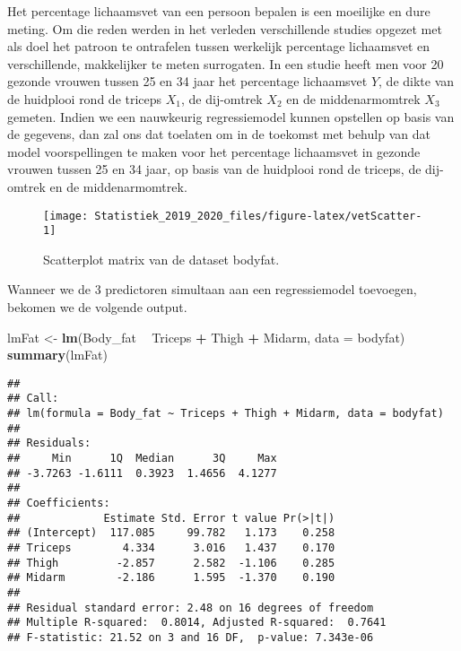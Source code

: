 \documentclass[12pt,dutch,coursenotes]{book}
\newenvironment{Shaded}{\begin{snugshade}}{\end{snugshade}}
\newcommand{\KeywordTok}[1]{\textcolor[rgb]{0.13,0.29,0.53}{\textbf{#1}}}
\newcommand{\DataTypeTok}[1]{\textcolor[rgb]{0.13,0.29,0.53}{#1}}
\newcommand{\StringTok}[1]{\textcolor[rgb]{0.31,0.60,0.02}{#1}}
\newcommand{\OperatorTok}[1]{\textcolor[rgb]{0.81,0.36,0.00}{\textbf{#1}}}
\newcommand{\NormalTok}[1]{#1}
\theoremstyle{definition}
\theoremstyle{definition}
\theoremstyle{definition}
\theoremstyle{remark}
\begin{document}
Het percentage lichaamsvet van een persoon bepalen is een moeilijke en
dure meting. Om die reden werden in het verleden verschillende studies
opgezet met als doel het patroon te ontrafelen tussen werkelijk
percentage lichaamsvet en verschillende, makkelijker te meten
surrogaten. In een studie heeft men voor 20 gezonde vrouwen tussen 25 en
34 jaar het percentage lichaamsvet \(Y\), de dikte van de huidplooi rond
de triceps \(X_1\), de dij-omtrek \(X_2\) en de middenarmomtrek \(X_3\)
gemeten. Indien we een nauwkeurig regressiemodel kunnen opstellen op
basis van de gegevens, dan zal ons dat toelaten om in de toekomst met
behulp van dat model voorspellingen te maken voor het percentage
lichaamsvet in gezonde vrouwen tussen 25 en 34 jaar, op basis van de
huidplooi rond de triceps, de dij-omtrek en de middenarmomtrek.

\begin{figure}

{\centering \texttt{[image: Statistiek\_2019\_2020\_files/figure-latex/vetScatter-1]} 

}

\caption{Scatterplot matrix van de dataset bodyfat.}\label{fig:vetScatter}
\end{figure}

Wanneer we de 3 predictoren simultaan aan een regressiemodel toevoegen,
bekomen we de volgende output.

\begin{Shaded}
\begin{Highlighting}[]
\NormalTok{lmFat <-}\StringTok{ }\KeywordTok{lm}\NormalTok{(Body_fat }\OperatorTok{~}\StringTok{ }\NormalTok{Triceps }\OperatorTok{+}\StringTok{ }\NormalTok{Thigh }\OperatorTok{+}\StringTok{ }\NormalTok{Midarm, }\DataTypeTok{data =}\NormalTok{ bodyfat)}
\KeywordTok{summary}\NormalTok{(lmFat)}
\end{Highlighting}
\end{Shaded}

\begin{verbatim}
## 
## Call:
## lm(formula = Body_fat ~ Triceps + Thigh + Midarm, data = bodyfat)
## 
## Residuals:
##     Min      1Q  Median      3Q     Max 
## -3.7263 -1.6111  0.3923  1.4656  4.1277 
## 
## Coefficients:
##             Estimate Std. Error t value Pr(>|t|)
## (Intercept)  117.085     99.782   1.173    0.258
## Triceps        4.334      3.016   1.437    0.170
## Thigh         -2.857      2.582  -1.106    0.285
## Midarm        -2.186      1.595  -1.370    0.190
## 
## Residual standard error: 2.48 on 16 degrees of freedom
## Multiple R-squared:  0.8014, Adjusted R-squared:  0.7641 
## F-statistic: 21.52 on 3 and 16 DF,  p-value: 7.343e-06
\end{verbatim}
\end{document}
